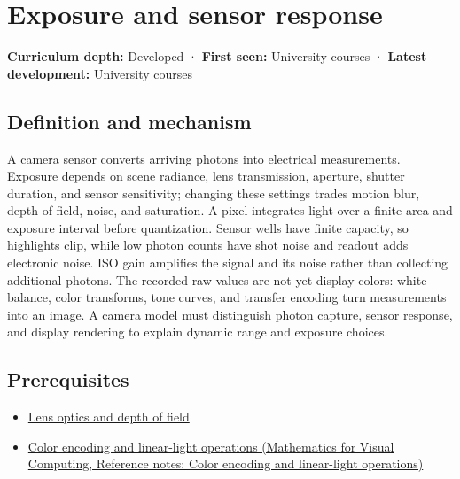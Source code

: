 \hypertarget{appendix-92d45cdf2afc}{}\label{referencestart:appendix-92d45cdf2afc}
\section{Exposure and sensor response}\label{appendix-92d45cdf2afc-exposure-and-sensor-response}

\hypertarget{appendix-92d45cdf2afc-exposure-and-sensor-response}{}

\textbf{Curriculum depth:} Developed · \textbf{First seen:} University courses · \textbf{Latest development:} University courses

\begin{allmightroledefinition}

\subsection{Definition and mechanism}\label{appendix-92d45cdf2afc-definition-and-mechanism}

\hypertarget{appendix-92d45cdf2afc-definition-and-mechanism}{}

A camera sensor converts arriving photons into electrical measurements. Exposure depends on scene radiance, lens transmission, aperture, shutter duration, and sensor sensitivity; changing these settings trades motion blur, depth of field, noise, and saturation. A pixel integrates light over a finite area and exposure interval before quantization. Sensor wells have finite capacity, so highlights clip, while low photon counts have shot noise and readout adds electronic noise. ISO gain amplifies the signal and its noise rather than collecting additional photons. The recorded raw values are not yet display colors: white balance, color transforms, tone curves, and transfer encoding turn measurements into an image. A camera model must distinguish photon capture, sensor response, and display rendering to explain dynamic range and exposure choices.

\end{allmightroledefinition}

\subsection{Prerequisites}\label{appendix-92d45cdf2afc-prerequisites}

\hypertarget{appendix-92d45cdf2afc-prerequisites}{}

\begin{itemize}
\tightlist
\item
  \hyperref[appendix-21f8456e2629]{Lens optics and depth of field}
\item
  \href{../02-Mathematics-for-Visual-Computing/main.pdf\#nameddest=appendix-a9f83ad40792}{Color encoding and linear-light operations (Mathematics for Visual Computing, Reference notes: Color encoding and linear-light operations)}
\end{itemize}

